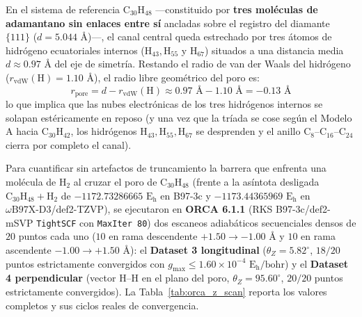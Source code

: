 \documentclass[10pt,twocolumn,a4paper]{article}
\begin{document}
En el sistema de referencia $\text{C}_{30}\text{H}_{48}$ —constituido por \textbf{tres moléculas de adamantano sin enlaces entre sí} ancladas sobre el registro del diamante $\{111\}$ ($d = 5.044\text{ \AA}$)—, el canal central queda estrechado por tres átomos de hidrógeno ecuatoriales internos ($\text{H}_{43}, \text{H}_{55}$ y $\text{H}_{67}$) situados a una distancia media $d \approx 0.97\text{ \AA}$ del eje de simetría. Restando el radio de van der Waals del hidrógeno ($r_{\text{vdW}}(\text{H}) = 1.10\text{ \AA}$), el radio libre geométrico del poro es:
\begin{equation}
r_{\text{pore}} = d - r_{\text{vdW}}(\text{H}) \approx 0.97\text{ \AA} - 1.10\text{ \AA} = \mathbf{-0.13\text{ \AA}}
\end{equation}
lo que implica que las nubes electrónicas de los tres hidrógenos internos se solapan estéricamente en reposo (y una vez que la tríada se cose según el Modelo A hacia $\text{C}_{30}\text{H}_{42}$, los hidrógenos $\text{H}_{43}, \text{H}_{55}, \text{H}_{67}$ se desprenden y el anillo $\text{C}_8\text{--C}_{16}\text{--C}_{24}$ cierra por completo el canal).

Para cuantificar sin artefactos de truncamiento la barrera que enfrenta una molécula de $\text{H}_2$ al cruzar el poro de $\text{C}_{30}\text{H}_{48}$ (frente a la asíntota desligada $\text{C}_{30}\text{H}_{48} + \text{H}_2$ de $-1172.73286665\text{ E}_\text{h}$ en B97-3c y $-1173.44365969\text{ E}_\text{h}$ en $\omega\text{B97X-D3}$/def2-TZVP), se ejecutaron en \textbf{ORCA 6.1.1} (RKS B97-3c/def2-mSVP \texttt{TightSCF} con \texttt{MaxIter 80}) dos escaneos adiabáticos secuenciales densos de $20$ puntos cada uno ($10$ en rama descendente $+1.50 \to -1.00\text{ \AA}$ y $10$ en rama ascendente $-1.00 \to +1.50\text{ \AA}$): el \textbf{Dataset 3 longitudinal} ($\theta_Z = 5.82^\circ$, $18/20$ puntos estrictamente convergidos con $g_{\max} \le 1.60 \times 10^{-4}\text{ E}_\text{h}/\text{bohr}$) y el \textbf{Dataset 4 perpendicular} (vector $\text{H--H}$ en el plano del poro, $\theta_Z = 95.60^\circ$, $20/20$ puntos estrictamente convergidos). La Tabla~\ref{tab:orca_z_scan} reporta los valores completos y sus ciclos reales de convergencia.
\end{document}
